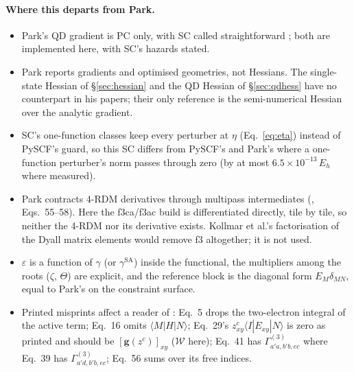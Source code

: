 \documentclass[11pt]{article}
\newcommand{\eps}{\varepsilon}
\begin{document}
\paragraph{Where this departs from Park.}
\begin{itemize}
\item Park's QD gradient is PC only, with SC called straightforward
  \cite{park2020}; both are implemented here, with SC's hazards stated.
\item Park reports gradients and optimised geometries, not Hessians. The
  single-state Hessian of \S\ref{sec:hessian} and the QD Hessian of
  \S\ref{sec:qdhess} have no counterpart in his papers; their only
  reference is the semi-numerical Hessian over the analytic gradient.
\item SC's one-function classes keep every perturber at $\eta$
  (Eq.~\eqref{eq:eta}) instead of PySCF's guard, so this SC differs from
  PySCF's and Park's where a one-function perturber's norm passes through
  zero (by at most $6.5\times10^{-13}\,E_h$ where measured).
\item Park contracts 4-RDM derivatives through multipass intermediates
  (\cite{park2020}, Eqs.~55--58). Here the f3ca/f3ac build is differentiated
  directly, tile by tile, so neither the 4-RDM nor its derivative exists.
  Kollmar et al.'s factorisation of the Dyall matrix elements
  \cite{kollmar2021} would remove f3 altogether; it is not used.
\item $\eps$ is a function of $\gamma$ (or $\gamma^{\mathrm{SA}}$) inside the
  functional, the multipliers among the roots ($\zeta$, $\Theta$) are
  explicit, and the reference block is the diagonal form
  $E_M\delta_{MN}$, equal to Park's on the constraint surface.
\item Printed misprints affect a reader of \cite{park2020}: Eq.~5 drops the
  two-electron integral of the active term; Eq.~16 omits
  $\langle M|H|N\rangle$; Eq.~29's $z^c_{xy}\langle I|E_{xy}|N\rangle$ is zero
  as printed and should be $[\mathbf g(z^c)]_{xy}$ ($\mathcal W$ here); Eq.~41
  has $\Gamma^{(3)}_{a'a,b'b,ec}$ where Eq.~39 has $\Gamma^{(3)}_{a'd,b'b,ec}$;
  Eq.~56 sums over its free indices.
\end{itemize}
\end{document}
